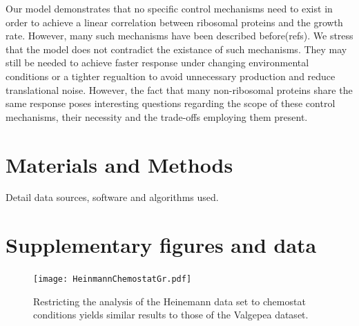 \documentclass[notitlepage]{article}
\begin{document}
Our model demonstrates that no specific control mechanisms need to exist in order to achieve a linear correlation between ribosomal proteins and the growth rate.
However, many such mechanisms have been described before(refs).
We stress that the model does not contradict the existance of such mechanisms.
They may still be needed to achieve faster response under changing environmental conditions or a tighter regualtion to avoid unnecessary production and reduce translational noise.
However, the fact that many non-ribosomal proteins share the same response poses interesting questions regarding the scope of these control mechanisms, their necessity and the trade-offs employing them present.

\section{Materials and Methods}
Detail data sources, software and algorithms used.

\section{Supplementary figures and data}
\begin{figure}[h]
\centering
\texttt{[image: HeinmannChemostatGr.pdf]}
\caption{
  Restricting the analysis of the Heinemann data set to chemostat conditions yields similar results to those of the Valgepea dataset.
}
\label{fig:growthcorrchemo}
\end{figure}

\printbibliography
\end{document}
